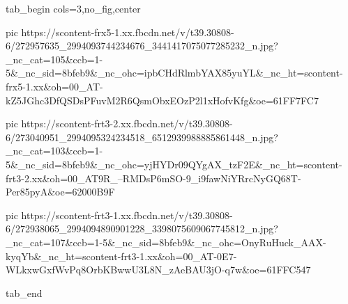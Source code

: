  
 
 
 
 


\ifcmt
  tab_begin cols=3,no_fig,center

     pic https://scontent-frx5-1.xx.fbcdn.net/v/t39.30808-6/272957635_2994093744234676_3441417075077285232_n.jpg?_nc_cat=105&ccb=1-5&_nc_sid=8bfeb9&_nc_ohc=ipbCHdRlmbYAX85yuYL&_nc_ht=scontent-frx5-1.xx&oh=00_AT-kZ5JGhc3DfQSDsPFuvM2R6QsmObxEOzP2l1xHofvKfg&oe=61FF7FC7

     pic https://scontent-frt3-2.xx.fbcdn.net/v/t39.30808-6/273040951_2994095324234518_6512939988885861448_n.jpg?_nc_cat=103&ccb=1-5&_nc_sid=8bfeb9&_nc_ohc=yjHYDr09QYgAX_tzF2E&_nc_ht=scontent-frt3-2.xx&oh=00_AT9R_--RMDsP6mSO-9_i9fawNiYRrcNyGQ68T-Per85pyA&oe=62000B9F

     pic https://scontent-frt3-1.xx.fbcdn.net/v/t39.30808-6/272938065_2994094890901228_3398075609067745812_n.jpg?_nc_cat=107&ccb=1-5&_nc_sid=8bfeb9&_nc_ohc=OnyRuHuck_AAX-kyqYb&_nc_ht=scontent-frt3-1.xx&oh=00_AT-0E7-WLkxwGxfWvPq8OrbKBwwU3L8N_zAeBAU3jO-q7w&oe=61FFC547

  tab_end
\fi

